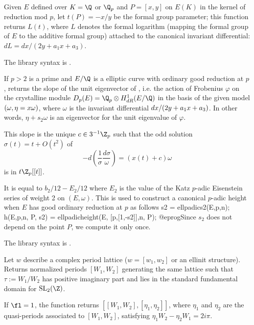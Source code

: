 \label{se:ellpadiclog}
Given $E$ defined over $K = \Q$ or $\Q_p$ and $P = [x,y]$ on $E(K)$ in the
kernel of reduction mod $p$, let $t(P) = -x/y$ be the formal group
parameter; this function returns $L(t)$, where $L$ denotes the formal
logarithm (mapping  the formal group of $E$  to the additive formal group)
attached to the canonical invariant differential:
$dL = dx/(2y + a_1x + a_3)$.

The library syntax is .

\label{se:ellpadics2}
If $p>2$ is a prime and $E/\Q$ is a elliptic curve with ordinary good
reduction at $p$, returns the slope of the unit eigenvector
of , i.e. the action of Frobenius $\varphi$ on
the crystalline module $D_p(E)= \Q_p \otimes H^1_{dR}(E/\Q)$ in the basis of
the given model $(\omega, \eta=x\*\omega)$, where $\omega$ is the invariant
differential $dx/(2\*y+a_1\*x+a_3)$. In other words, $\eta + s_2\omega$
is an eigenvector for the unit eigenvalue of $\varphi$.

This slope is the unique $c \in 3^{-1}\Z_p$ such that the odd solution
  $\sigma(t) = t + O(t^2)$ of
$$ - d(\dfrac{1}{\sigma} \dfrac{d \sigma}{\omega})
 = (x(t) + c) \omega$$
is in $t\Z_p[[t]]$.

It is equal to $b_2/12 - E_2/12$ where $E_2$ is the value of the Katz
$p$-adic Eisenstein series of weight 2 on $(E,\omega)$. This is
used to construct a canonical $p$-adic height when $E$ has good ordinary
reduction at $p$ as follows
\bprog
s2 = ellpadics2(E,p,n);
h(E,p,n, P, s2) = ellpadicheight(E, [p,[1,-s2]],n, P);
@eprog\noindent Since $s_2$ does not depend on the point $P$, we compute it
only once.

The library syntax is .

\label{se:ellperiods}
Let $w$ describe a complex period lattice ($w = [w_1,w_2]$
or an ellinit structure). Returns normalized periods $[W_1,W_2]$ generating
the same lattice such that $\tau := W_1/W_2$ has positive imaginary part
and lies in the standard fundamental domain for $\text{SL}_2(\Z)$.

If $\fl = 1$, the function returns $[[W_1,W_2], [\eta_1,\eta_2]]$, where
$\eta_1$ and $\eta_2$ are the quasi-periods associated to
$[W_1,W_2]$, satisfying $\eta_1 W_2 - \eta_2 W_1 = 2 i \pi$.

